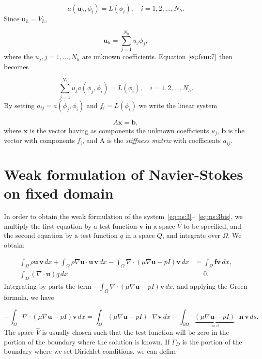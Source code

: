 \documentclass[a4paper,11pt,oneside]{book}
\begin{document}
\begin{equation}
\label{eq:fem:7}
a(\mathbf{u}_h, \phi_i) = L(\phi_i), \quad i = 1,2, \ldots, N_h.
\end{equation}
Since $\mathbf{u}_h = V_h$,

\begin{equation}
\mathbf{u}_h = \sum_{j=1}^{N_h} u_j \phi_j,
\end{equation}
where the $u_j, j=1, \ldots, N_h$ are unknown coefficients. Equation $\ref{eq:fem:7}$ then becomes

\begin{equation}
\sum_{j=1}^{N_h} u_j a(\phi_j, \phi_i) = L(\phi_i), \quad i = 1,2, \ldots, N_h.
\end{equation}
By setting $a_{ij} = a(\phi_j, \phi_i)$ and $f_i = L(\phi_i)$ we write the linear system

\begin{equation}
A \mathbf{x} = \mathbf{b},
\end{equation}
where $\mathbf{x}$ is the vector having as components the unknown coefficients $u_j$, $\mathbf{b}$ is the vector with components $f_i$, and A is the \emph{stiffness matrix} with coefficients $a_{ij}$.



\section{Weak formulation of Navier-Stokes on fixed domain}

In order to obtain the weak formulation of the system~\eqref{eq:ns:3}--~\eqref{eq:ns:3bis}, we multiply the first equation by a test function $\mathbf{v}$ in a space $\hat{V}$ to be specified, and the second equation by a test function $q$ in a space $Q$, and integrate over $\Omega$. 
We obtain:

\begin{align}
\label{eq:ns:9}
\int_{\Omega} \rho \dot{\mathbf{u}} \, \mathbf{v} \, dx
+ \int_{\Omega} \rho \nabla \mathbf{u}  \cdot \mathbf{u} \, \mathbf{v} \, dx
- \int_{\Omega} \nabla \cdot (\mu \nabla \mathbf{u} - pI)\mathbf{v} \, dx
&= \int_{\Omega} \mathbf{f} \mathbf{v} \, dx, \\
\int_{\Omega}  (\nabla \cdot \mathbf{u}) q \, dx &= 0.
\end{align}
Integrating by parts the term $- \int_{\Omega} \nabla \cdot (\mu \nabla \mathbf{u} - pI)\mathbf{v} \, dx$, and applying the Green formula, we have

\begin{equation}
\label{eq:green}
- \int_{\Omega} \nabla \cdot (\mu \nabla \mathbf{u} - pI)\mathbf{v} \, dx =  \int_{\Omega} (\mu \nabla \mathbf{u} - pI) \cdot \nabla \mathbf{v} \, dx - \int_{\partial \Omega}  \underbrace{ (\mu \nabla \mathbf{u} - pI)}_{= \sigma} \cdot \mathbf{n} \, \mathbf{v} \, ds.
\end{equation}
The space $\hat{V}$ is usually chosen such that the test function will be zero in the portion of the boundary where the solution is known. If $\Gamma_D$ is the portion of the boundary where we set Dirichlet conditions, we can define
\end{document}
